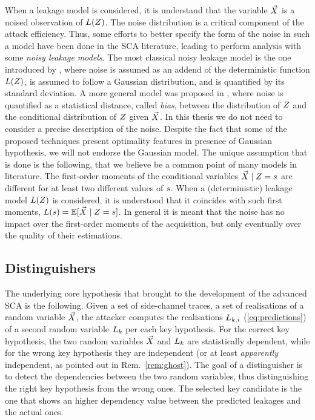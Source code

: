 When a leakage model is considered, it is understand that the variable $\vec{X}$ is a noised observation of $L(Z)$. The noise distribution is a critical component of the attack efficiency. Thus, some efforts to better specify the form of the noise in such a model have been done in the SCA literature, leading to perform analysis with some \emph{noisy leakage models}.  The most classical noisy leakage model is the one introduced by \cite{chari1999towards}, where noise is assumed as an addend of the deterministic function $L(Z)$, is assumed to follow a Gaussian distribution, and is quantified by its standard deviation. A more general model was proposed in \cite{prouff2013masking}, where noise is quantified as a statistical distance, called \emph{bias}, between the distribution of $Z$ and the conditional distribution of $Z$ given $\vec{X}$.  In this thesis we do not need to consider a precise description of the noise. Despite the fact that some of the proposed techniques present optimality features in presence of Gaussian hypothesis, we will not endorse the Gaussian model. The unique assumption that is done is the following, that we believe be a common point of many models in literature. The first-order moments of the conditional variables $\given{\vaLeakVec}{\sensRandVar=\sensVarGenValue}$ are different for at least two different values of $s$. When a (deterministic) leakage model $L(Z)$ is considered, it is understood that it coincides with such first moments, \ie $\leakageModel(\sensVarGenValue)= \esper[\given{\vaLeakVec}{\sensRandVar=\sensVarGenValue}]$. In general it is meant that the noise has no impact over the first-order moments of the acquisition, but only eventually over the quality of their estimations. 


\subsection{Distinguishers}\label{sec:distinguishers}
The underlying core hypothesis that brought to the development of the advanced SCA is the following. Given a set of side-channel traces, \ie a set of realisations of a random variable $\vec{X}$, the attacker computes the realisations $L_{k,i}$ (\via \eqref{eq:predictions}) of a second random variable $L_k$ per each key hypothesis. For the correct key hypothesis, the two random variables $\vec{X}$ and $L_k$ are statistically dependent, while for the wrong key hypothesis they are independent (or at least \emph{apparently} independent, as pointed out in Rem.~\ref{rem:ghost}). The goal of a distinguisher is to detect the dependencies between the two random variables, thus distinguishing the right key hypothesis from the wrong ones. The selected key candidate is the one that shows an higher dependency value between the  predicted leakages and the actual ones. 

